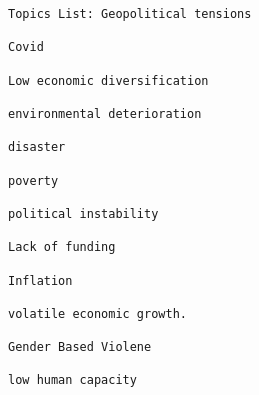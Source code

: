 \documentclass[11pt]{article}
\begin{document}
    \begin{Verbatim}[commandchars=\\\{\}]
Topics List: Geopolitical tensions

Covid

Low economic diversification

environmental deterioration

disaster

poverty

political instability

Lack of funding

Inflation

volatile economic growth.

Gender Based Violene

low human capacity
    \end{Verbatim}
\end{document}

